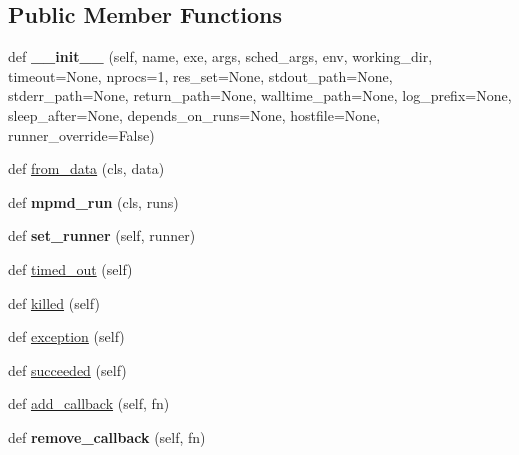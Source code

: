 \subsection*{Public Member Functions}
\begin{DoxyCompactItemize}
\item 
\mbox{\label{classcodar_1_1savanna_1_1model_1_1_run_a796853700dcd65de0394fa521b0d5c21}} 
def {\bfseries \+\_\+\+\_\+init\+\_\+\+\_\+} (self, name, exe, args, sched\+\_\+args, env, working\+\_\+dir, timeout=None, nprocs=1, res\+\_\+set=None, stdout\+\_\+path=None, stderr\+\_\+path=None, return\+\_\+path=None, walltime\+\_\+path=None, log\+\_\+prefix=None, sleep\+\_\+after=None, depends\+\_\+on\+\_\+runs=None, hostfile=None, runner\+\_\+override=False)
\item 
def \hyperlink{classcodar_1_1savanna_1_1model_1_1_run_a8fab27229098b129079844b82035eab2}{from\+\_\+data} (cls, data)
\item 
\mbox{\label{classcodar_1_1savanna_1_1model_1_1_run_a1624f958c672fd64cbb2e4d124c69890}} 
def {\bfseries mpmd\+\_\+run} (cls, runs)
\item 
\mbox{\label{classcodar_1_1savanna_1_1model_1_1_run_aac3822b6e9166a3c2c5ea7906d89ece9}} 
def {\bfseries set\+\_\+runner} (self, runner)
\item 
def \hyperlink{classcodar_1_1savanna_1_1model_1_1_run_a3d5293dbe910c5e940e71ceeeb82778d}{timed\+\_\+out} (self)
\item 
def \hyperlink{classcodar_1_1savanna_1_1model_1_1_run_abf7413759a4e4d456e978e5bade25e02}{killed} (self)
\item 
def \hyperlink{classcodar_1_1savanna_1_1model_1_1_run_a3e764a9c156037997b107a268716cf7e}{exception} (self)
\item 
def \hyperlink{classcodar_1_1savanna_1_1model_1_1_run_a5b08f9604e4010ab32059e3291448cda}{succeeded} (self)
\item 
def \hyperlink{classcodar_1_1savanna_1_1model_1_1_run_a73899dead2dbe21ee0242edf9e21515d}{add\+\_\+callback} (self, fn)
\item 
\mbox{\label{classcodar_1_1savanna_1_1model_1_1_run_a470a9f2082dcf6244fdf330dc8dc7990}} 
def {\bfseries remove\+\_\+callback} (self, fn)

\end{DoxyCompactItemize}
